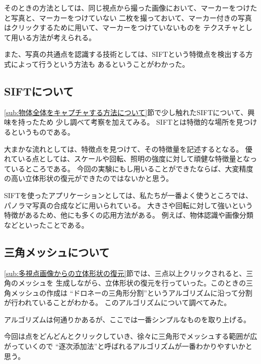 \documentclass[11pt,a4j]{jsarticle}
\begin{document}
そのときの方法としては、同じ視点から撮った画像において、マーカーをつけたと写真と、マーカーをつけていない
二枚を撮っておいて、マーカー付きの写真はクリックするために用いて、マーカーをつけていないものを
テクスチャとして用いる方法が考えられる。

また、写真の共通点を認識する技術としては、SIFTという特徴点を検出する方式によって行うという方法も
あるということがわかった。

\subsection{SIFTについて}
\label{sub:SIFTについて}

\ref{sub:物体全体をキャプチャする方法について}節で少し触れたSIFTについて、興味を持ったため
少し調べて考察を加えてみる。
SIFTとは特徴的な場所を見つけるというものである。

大まかな流れとしては、特徴点を見つけて、その特徴量を記述するとなる。
優れている点としては、スケールや回転、照明の強度に対して頑健な特徴量となっているところである。
今回の実験にもし用いることができたならば、大変精度の高い立体形状の復元ができたのではないかと思う。


SIFTを使ったアプリケーションとしては、私たちが一番よく使うところでは、
パノラマ写真の合成などに用いられている。
大きさや回転に対して強いという特徴があるため、他にも多くの応用方法がある。
例えば、物体認識や画像分類などといったことである。

\subsection{三角メッシュについて}
\label{sub:三角メッシュについて}
\ref{sub:多視点画像からの立体形状の復元}節では、三点以上クリックされると、三角のメッシュを
生成しながら、立体形状の復元を行っていった。このときの三角メッシュの作成は
``ドロネーの三角形分割''というアルゴリズムに沿って分割が行われていることがわかる。
このアルゴリズムについて調べてみた。

アルゴリズムは何通りかあるが、ここでは一番シンプルなものを取り上げる。

今回は点をどんどんとクリックしていき、徐々に三角形でメッシュする範囲が広がっていくので
``逐次添加法''と呼ばれるアルゴリズムが一番わかりやすいかと思う。
\end{document}
